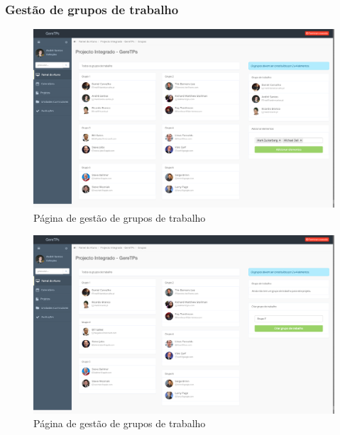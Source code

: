 \subsubsection{Gestão de grupos de trabalho}

\begin{figure}[H]
  \centering
  \includegraphics[width=1\textwidth,center]{images/implementacao/alunos/groups_add}
  \caption{Página de gestão de grupos de trabalho}
  \label{fig:student_groups_add}
\end{figure}

\begin{figure}[H]
  \centering
  \includegraphics[width=1\textwidth,center]{images/implementacao/alunos/groups_create}
  \caption{Página de gestão de grupos de trabalho}
  \label{fig:student_groups_create}
\end{figure}
